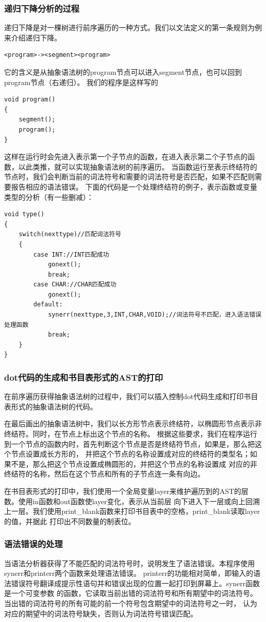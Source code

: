 \documentclass[supercite]{Experimental_Report}
\theoremstyle{definition}
\begin{document}
\subsubsection{递归下降分析的过程}
递归下降是对一棵树进行前序遍历的一种方式。我们以文法定义的第一条规则为例来介绍递归下降。
\begin{lstlisting}[title=文法定义的第一条规则,frame=none]
<program>-><segment><program>
\end{lstlisting}
它的含义是从抽象语法树的program节点可以进入segment节点，也可以回到program节点（右递归）。
我们的程序是这样写的
\begin{lstlisting}[title=递归下降的例子,frame=none]
void program()
{
	segment();
	program();
}
\end{lstlisting}
这样在运行时会先进入表示第一个子节点的函数，在进入表示第二个子节点的函数，以此类推，就可以实现抽象语法树的前序遍历。
当函数运行至表示终结符的节点时，我们会判断当前的词法符号和需要的词法符号是否匹配，如果不匹配则需要报告相应的语法错误。
下面的代码是一个处理终结符的例子，表示函数或变量类型的分析（有一些删减）：
\begin{lstlisting}[title=type函数中的部分代码,frame=none]
void type()
{
	switch(nexttype)//匹配词法符号
	{
		case INT://INT匹配成功
			gonext();
			break;
		case CHAR://CHAR匹配成功
			gonext();
		default:
			synerr(nexttype,3,INT,CHAR,VOID);//词法符号不匹配，进入语法错误处理函数
			break;
	}
}
\end{lstlisting}
\subsubsection{dot代码的生成和书目表形式的AST的打印}
在前序遍历获得抽象语法树的过程中，我们可以插入控制dot代码生成和打印书目表形式的抽象语法树的代码。

在最后画出的抽象语法树中，我们以长方形节点表示终结符，以椭圆形节点表示非终结符。同时，在节点上标出这个节点的名称。
根据这些要求，我们在程序运行到一个节点的函数内时，首先判断这个节点是否是终结符节点，如果是，那么把这个节点设置成长方形的，
并把这个节点的名称设置成对应的终结符的类型名；如果不是，那么把这个节点设置成椭圆形的，并把这个节点的名称设置成
对应的非终结符的名称，然后在这个节点和所有的子节点连一条有向边。

在书目表形式的打印中，我们使用一个全局变量layer来维护遍历到的AST的层数。使用in函数和out函数使layer变化，表示从当前层
向下进入下一层或向上回溯上一层。我们使用print\_blank函数来打印书目表中的空格，print\_blank读取layer的值，并据此
打印出不同数量的制表位。
\subsubsection{语法错误的处理}
当语法分析器获得了不能匹配的词法符号时，说明发生了语法错误。本程序使用synerr和printerr两个函数来处理语法错误。
printerr的功能相对简单，即输入的语法错误符号翻译成提示性语句并和错误出现的位置一起打印到屏幕上。synerr函数是一个可变参数
的函数，它读取当前出错的词法符号和所有期望中的词法符号。当出错的词法符号的所有可能的前一个符号包含期望中的词法符号之一时，
认为对应的期望中的词法符号缺失，否则认为词法符号错误匹配。
\end{document}
